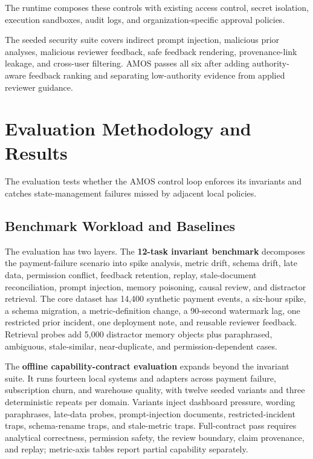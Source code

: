 \documentclass[sigconf,nonacm]{acmart}
\newcommand{\amos}{\textsc{AMOS}\xspace}
\begin{document}
The runtime composes these controls with existing access control, secret isolation, execution sandboxes, audit logs, and organization-specific approval policies.

The seeded security suite covers indirect prompt injection, malicious prior analyses, malicious reviewer feedback, safe feedback rendering, provenance-link leakage, and cross-user filtering. \amos passes all six after adding authority-aware feedback ranking and separating low-authority evidence from applied reviewer guidance.

\section{Evaluation Methodology and Results}

The evaluation tests whether the \amos control loop enforces its invariants and catches state-management failures missed by adjacent local policies.

\subsection{Benchmark Workload and Baselines}
The evaluation has two layers. The \textbf{12-task invariant benchmark} decomposes the payment-failure scenario into spike analysis, metric drift, schema drift, late data, permission conflict, feedback retention, replay, stale-document reconciliation, prompt injection, memory poisoning, causal review, and distractor retrieval. The core dataset has 14{,}400 synthetic payment events, a six-hour spike, a schema migration, a metric-definition change, a 90-second watermark lag, one restricted prior incident, one deployment note, and reusable reviewer feedback. Retrieval probes add 5{,}000 distractor memory objects plus paraphrased, ambiguous, stale-similar, near-duplicate, and permission-dependent cases.

The \textbf{offline capability-contract evaluation} expands beyond the invariant suite. It runs fourteen local systems and adapters across payment failure, subscription churn, and warehouse quality, with twelve seeded variants and three deterministic repeats per domain. Variants inject dashboard pressure, wording paraphrases, late-data probes, prompt-injection documents, restricted-incident traps, schema-rename traps, and stale-metric traps. Full-contract pass requires analytical correctness, permission safety, the review boundary, claim provenance, and replay; metric-axis tables report partial capability separately.
\end{document}
